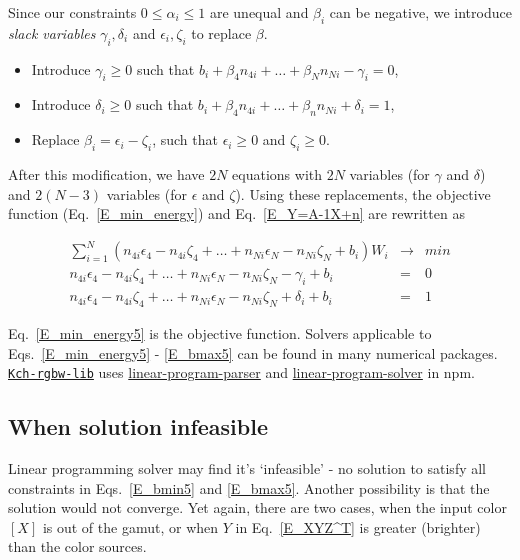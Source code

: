 \documentclass[dvipdfmx,uplatex,a4paper]{article}
\begin{document}
Since our constraints $0 \leq \alpha_i \leq 1$ are unequal and $\beta_i$ can be negative, we introduce \textit{slack variables} $\gamma_i, \delta_i$ and $\epsilon_i, \zeta_i$ to replace $\beta$.

\begin{itemize}
  \item Introduce $\gamma_i \geq 0$ such that $b_i + \beta_4 n_{4i} + \ldots + \beta_N n_{Ni} - \gamma_i = 0$,

  \item Introduce $\delta_i \geq 0$ such that $b_i + \beta_4 n_{4i} + \ldots + \beta_n n_{Ni} + \delta_i = 1$,

  \item Replace $\beta_i = \epsilon_i - \zeta_i$, such that $\epsilon_i \geq 0 $ and $\zeta_i \geq 0$.
\end{itemize}

After this modification, we have $2N$ equations with $2N$ variables (for $\gamma$ and $\delta$) and $2(N-3)$ variables (for $\epsilon$ and $\zeta$). Using these replacements, the objective function (Eq.~\eqref{E_min_energy}) and Eq.~\eqref{E_Y=A-1X+n} are rewritten as

\begin{eqnarray}
%
  \label{E_min_energy5}
  \sum_{i=1}^N (n_{4i} \epsilon_4 - n_{4i} \zeta_4 + \ldots +  n_{Ni} \epsilon_N - n_{Ni} \zeta_N + b_{i}) W_i &\to& min \\
%
  \label{E_bmin5}
  n_{4i} \epsilon_4  - n_{4i} \zeta_4 + \ldots + n_{Ni} \epsilon_N  - n_{Ni} \zeta_N  - \gamma_i + b_i &=& 0 \\
%
  \label{E_bmax5}
  n_{4i} \epsilon_4  - n_{4i} \zeta_4 + \ldots + n_{Ni} \epsilon_N  - n_{Ni} \zeta_N  + \delta_i + b_i &=& 1
\end{eqnarray}

\noindent
Eq.~\eqref{E_min_energy5} is the objective function. Solvers applicable to Eqs.~\eqref{E_min_energy5} - \eqref{E_bmax5} can be found in many numerical packages. \href{https://www.npmjs.com/package/kch-rgbw-lib}{\texttt{Kch-rgbw-lib}} uses \href{https://www.npmjs.com/package/linear-program-parser}{linear-program-parser} and \href{https://www.npmjs.com/package/linear-program-solver}{linear-program-solver} in npm.

\subsection{When solution infeasible}
Linear programming solver may find it's `infeasible' - no solution to satisfy all constraints in Eqs.~\eqref{E_bmin5} and \eqref{E_bmax5}. Another possibility is that the solution would not converge. Yet again, there are two cases, when the input color $[X]$ is out of the gamut, or when $Y$ in Eq.~\eqref{E_XYZ^T} is greater (brighter) than the color sources.
\end{document}
